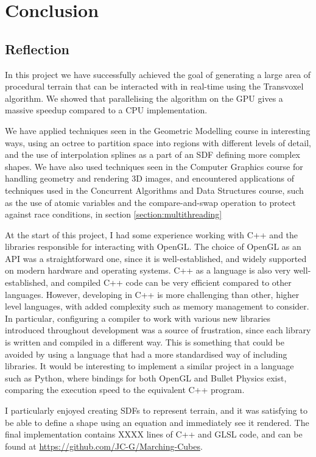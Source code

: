 \documentclass[11pt]{article}
\begin{document}
\section{Conclusion}
\subsection{Reflection}
In this project we have successfully achieved the goal of generating a large area of procedural terrain that can be interacted with in real-time using the Transvoxel algorithm. We showed that parallelising the algorithm on the GPU gives a massive speedup compared to a CPU implementation.

We have applied techniques seen in the Geometric Modelling course in interesting ways, using an octree to partition space into regions with different levels of detail, and the use of interpolation splines as a part of an SDF defining more complex shapes. We have also used techniques seen in the Computer Graphics course for handling geometry and rendering 3D images, and encountered applications of techniques used in the Concurrent Algorithms and Data Structures course, such as the use of atomic variables and the compare-and-swap operation to protect against race conditions, in section \ref{section:multithreading}

At the start of this project, I had some experience working with C++ and the libraries responsible for interacting with OpenGL. The choice of OpenGL as an API was a straightforward one, since it is well-established, and widely supported on modern hardware and operating systems. C++ as a language is also very well-established, and compiled C++ code can be very efficient compared to other languages. However, developing in C++ is more challenging than other, higher level languages, with added complexity such as memory management to consider. In particular, configuring a compiler to work with various new libraries introduced throughout development was a source of frustration, since each library is written and compiled in a different way. This is something that could be avoided by using a language that had a more standardised way of including libraries. It would be interesting to implement a similar project in a language such as Python, where bindings for both OpenGL and Bullet Physics exist, comparing the execution speed to the equivalent C++ program.

I particularly enjoyed creating SDFs to represent terrain, and it was satisfying to be able to define a shape using an equation and immediately see it rendered. 
The final implementation contains XXXX lines of C++ and GLSL code, and can be found at \url{https://github.com/JC-G/Marching-Cubes}.
\end{document}
